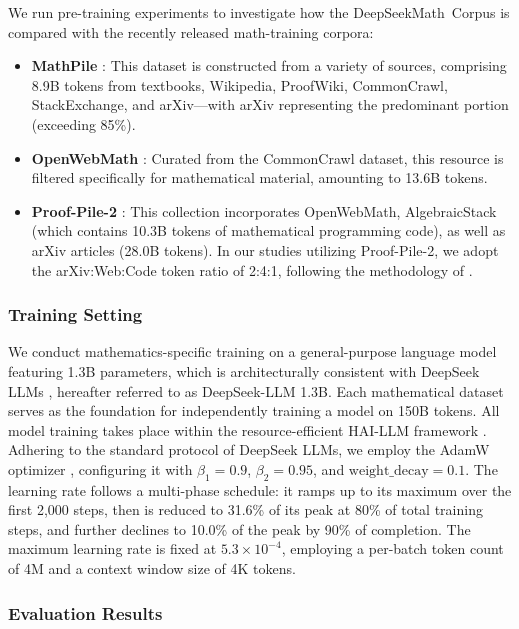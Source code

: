 \begin{itemize}[topsep=0pt]
We run pre-training experiments to investigate how the DeepSeekMath~Corpus is compared with the recently released math-training corpora:

\begin{itemize}[topsep=0pt]
    \item \textbf{MathPile} \citep{mathpile}: This dataset is constructed from a variety of sources, comprising 8.9B tokens from textbooks, Wikipedia, ProofWiki, CommonCrawl, StackExchange, and arXiv—with arXiv representing the predominant portion (exceeding 85\%).
    \item \textbf{OpenWebMath} \citep{openwebmath}: Curated from the CommonCrawl dataset, this resource is filtered specifically for mathematical material, amounting to 13.6B tokens.
    \item \textbf{Proof-Pile-2} \citep{llemma}: This collection incorporates OpenWebMath, AlgebraicStack (which contains 10.3B tokens of mathematical programming code), as well as arXiv articles (28.0B tokens). In our studies utilizing Proof-Pile-2, we adopt the arXiv:Web:Code token ratio of 2:4:1, following the methodology of \cite{llemma}.
\end{itemize}

\subsubsection{Training Setting}
\label{sec:quality-policy}
We conduct mathematics-specific training on a general-purpose language model featuring 1.3B parameters, which is architecturally consistent with DeepSeek LLMs \citep{deepseek-llm}, hereafter referred to as DeepSeek-LLM 1.3B. Each mathematical dataset serves as the foundation for independently training a model on 150B tokens. All model training takes place within the resource-efficient HAI-LLM framework \citep{haillm}. Adhering to the standard protocol of DeepSeek LLMs, we employ the AdamW optimizer \citep{adamW}, configuring it with $\beta_1=0.9$, $\beta_2=0.95$, and $\mathrm{weight\_decay}=0.1$. The learning rate follows a multi-phase schedule: it ramps up to its maximum over the first 2,000 steps, then is reduced to 31.6\% of its peak at 80\% of total training steps, and further declines to 10.0\% of the peak by 90\% of completion. The maximum learning rate is fixed at $5.3 \times 10^{-4}$, employing a per-batch token count of 4M and a context window size of 4K tokens.

\subsubsection{Evaluation Results}


\end{itemize}
